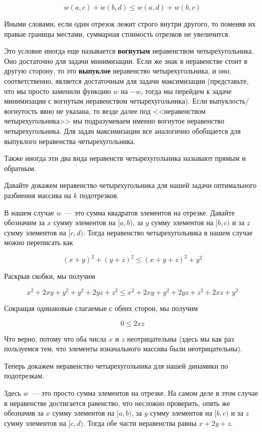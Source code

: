 $$w(a, c) + w(b, d) \le w(a, d) + w(b, c)$$

 Иными словами, если один отрезок лежит строго внутри другого, то поменяв их правые границы местами, суммарная стоимость отрезков не увеличится.

\begin{observation}
    Это условие иногда еще называется \textbf{вогнутым} неравенством четырехугольника. Оно достаточно для задачи минимизации. Если же знак в неравенстве стоит в другую сторону, то это \textbf{выпуклое} неравенство четырехугольника, и оно, соответственно, является достаточным для задачи максимизации (представьте, что мы просто заменили функцию $w$ на $-w$, тогда мы перейдем к задаче минимизации с вогнутым неравенством четырехугольника). Если выпуклость/вогнутость явно не указана, то везде далее под <<неравенством четырехугольника>> мы подразумеваем именно вогнутое неравенство четырехугольника. Для задач максимизации все аналогично обобщается для выпуклого неравенства четырехугольника.

    Также иногда эти два вида неравенств четырехугольника называют прямым и обратным.
\end{observation}

\begin{example}
    Давайте докажем неравенство четырехугольника для нашей задачи оптимального разбиения массива на $k$ подотрезков.

    В нашем случае $w$~--- это сумма квадратов элементов на отрезке. Давайте обозначим за $x$ сумму элементов на $[a, b)$, за $y$ сумму элементов на $[b, c)$ и за $z$ сумму элементов на $[c, d)$. Тогда неравенство четырехугольника в нашем случае можно переписать как

$$(x + y)^2 + (y + z)^2 \le (x + y + z)^2 + y^2$$

Раскрыв скобки, мы получим

$$x^2 + 2xy + y^2 + y^2 + 2yz + z^2 \le x^2 + 2xy + y^2 + 2yz + z^2 + 2xz + y^2$$

Сокращая одинаковые слагаемые с обеих сторон, мы получим

$$0 \le 2xz$$

Что верно, потому что оба числа $x$ и $z$ неотрицательны (здесь мы как раз пользуемся тем, что элементы изначального массива были неотрицательны).

\end{example}

\begin{example}
    Теперь докажем неравенство четырехугольника для нашей динамики по подотрезкам.

    Здесь $w$~--- это просто сумма элементов на отрезке. На самом деле в этом случае в неравенстве достигается равенство, что несложно проверить, опять же обозначив за $x$ сумму элементов на $[a, b)$, за $y$ сумму элементов на $[b, c)$ и за $z$ сумму элементов на $[c, d)$. Тогда обе части неравенства равны $x + 2y + z$.
\end{example}

